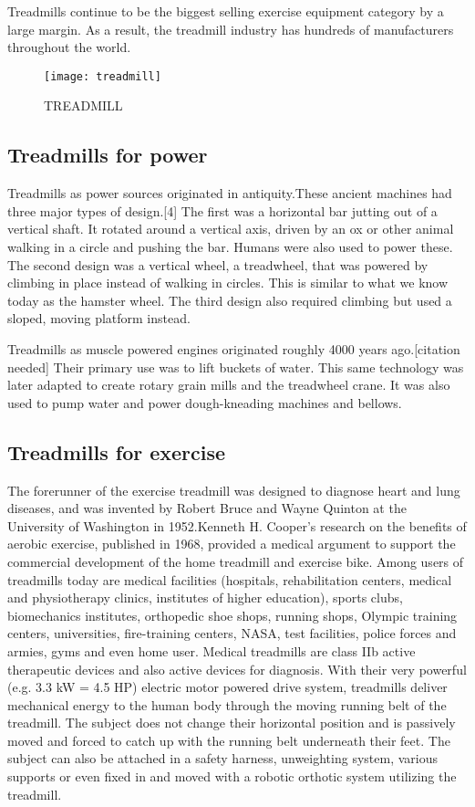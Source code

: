 \documentclass[12pt]{article}
\begin{document}
Treadmills continue to be the biggest selling exercise equipment category by a large margin. As a result, the treadmill industry has hundreds of manufacturers throughout the world.

\begin{figure}[h]
   \centering
   \texttt{[image: treadmill]}
   \caption{TREADMILL}
   \label{fig_treadmill}
\end{figure}


\subsection{Treadmills for power}
Treadmills as power sources originated in antiquity.These ancient machines had three major types of design.[4] The first was a horizontal bar jutting out of a vertical shaft. It rotated around a vertical axis, driven by an ox or other animal walking in a circle and pushing the bar. Humans were also used to power these. The second design was a vertical wheel, a treadwheel, that was powered by climbing in place instead of walking in circles. This is similar to what we know today as the hamster wheel. The third design also required climbing but used a sloped, moving platform instead.

Treadmills as muscle powered engines originated roughly 4000 years ago.[citation needed] Their primary use was to lift buckets of water. This same technology was later adapted to create rotary grain mills and the treadwheel crane. It was also used to pump water and power dough-kneading machines and bellows.


\subsection{Treadmills for exercise }
The forerunner of the exercise treadmill was designed to diagnose heart and lung diseases, and was invented by Robert Bruce and Wayne Quinton at the University of Washington in 1952.Kenneth H. Cooper's research on the benefits of aerobic exercise, published in 1968, provided a medical argument to support the commercial development of the home treadmill and exercise bike.          Among users of treadmills today are medical facilities (hospitals, rehabilitation centers, medical and physiotherapy clinics, institutes of higher education), sports clubs, biomechanics institutes, orthopedic shoe shops, running shops, Olympic training centers, universities, fire-training centers, NASA, test facilities, police forces and armies, gyms and even home user. Medical treadmills are class IIb active therapeutic devices and also active devices for diagnosis. With their very powerful (e.g. 3.3 kW = 4.5 HP) electric motor powered drive system, treadmills deliver mechanical energy to the human body through the moving running belt of the treadmill. The subject does not change their horizontal position and is passively moved and forced to catch up with the running belt underneath their feet. The subject can also be attached in a safety harness, unweighting system, various supports or even fixed in and moved with a robotic orthotic system utilizing the treadmill.
\clearpage
             
\end{document}
